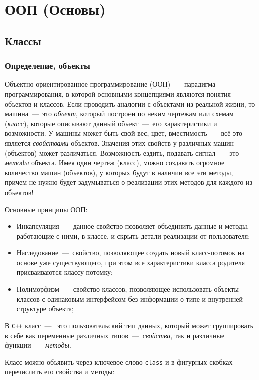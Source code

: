 \section{ООП (Основы)}
\subsection{Классы}
\subsubsection{Определение, объекты}

Объектно-ориентированное программирование (ООП)~---~парадигма программирования, в которой основными концепциями являются понятия объектов и классов. Если проводить аналогии с объектами из реальной жизни, то машина~---~это \emph{объект}, который построен по неким чертежам или схемам (\emph{класс}), которые описывают данный объект~---~его характеристики и возможности. У машины может быть свой вес, цвет, вместимость~---~всё это является \emph{свойствами} объектов. Значения этих свойств у различных машин (объектов) может различаться. Возможность ездить, подавать сигнал~---~это \emph{методы} объекта. Имея один чертеж (класс), можно создавать огромное количество машин (объектов), у которых будут в наличии все эти методы, причем не нужно будет задумываться о реализации этих методов для каждого из объектов!

Основные принципы ООП:
\begin{itemize}
    \item Инкапсуляция~---~данное свойство позволяет объединить данные и методы, работающие с ними, в классе, и скрыть детали реализации от пользователя;
    \item Наследование~---~свойство, позволяющее создать новый класс-потомок на основе уже существующего, при этом все характеристики класса родителя присваиваются классу-потомку;
    \item Полиморфизм~---~свойство классов, позволяющее использовать объекты классов с одинаковым интерфейсом без информации о типе и внутренней структуре объекта;
\end{itemize}

В \texttt{C++} класс~---~ это пользовательский тип данных, который может группировать в себе как переменные различных типов~---~\emph{свойства}, так и различные функции~---~\emph{методы}.

Класс можно объявить через ключевое слово \lstinline|class| и в фигурных скобках перечислить его свойства и методы:

